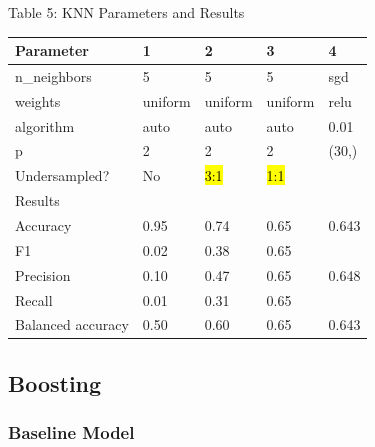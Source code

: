\documentclass{article}
\begin{document}
\begin{table}
	
	\centering
	Table 5: KNN Parameters and Results\\
	\begin{tabular}{ l l l l l }
		\hline
		Parameter & 1 & 2 & 3 & 4\\
		\hline
		n\_neighbors & 5 & 5 & 5 & sgd\\
		weights & uniform & uniform & uniform & relu\\
		algorithm & auto & auto & auto & 0.01\\
		p & 2 & 2 & 2 & (30,)\\
		Undersampled? & No & \hl{3:1} & \hl{1:1} & \\
		\hline
		Results & & & & \\
		\hline
		Accuracy & 0.95 & 0.74 & 0.65 & 0.643 \\
		F1 & 0.02 & 0.38 & 0.65 &  \\
		Precision & 0.10 & 0.47 & 0.65 & 0.648  \\
		Recall & 0.01 & 0.31 & 0.65 &  \\
		Balanced accuracy & 0.50 & 0.60 & 0.65 & 0.643 \\
		
		\hline 
	\end{tabular}
\end{table}


\subsection{Boosting}
\subsubsection*{Baseline Model}
\end{document}

